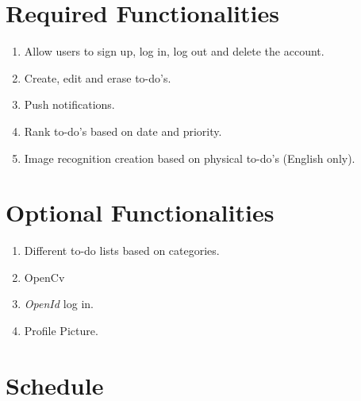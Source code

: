 \documentclass[12pt]{paper}
\begin{document}
	\section{Required Functionalities}
		\begin{enumerate}
			\item Allow users to sign up, log in, log out and delete the account.
			\item Create, edit and erase to-do's. 
			\item Push notifications.
			\item Rank to-do's based on date and priority.
			\item Image recognition creation based on physical to-do's (English only).
		\end{enumerate}
	
	\section{Optional Functionalities}
		\begin{enumerate}
			\item Different to-do lists based on categories.
			\item OpenCv
			\item \textit{OpenId \cite{openid}} log in.
			\item Profile Picture.
		\end{enumerate}
	\bigskip
	\section{Schedule}
	\pagebreak
	
	
\end{document}
